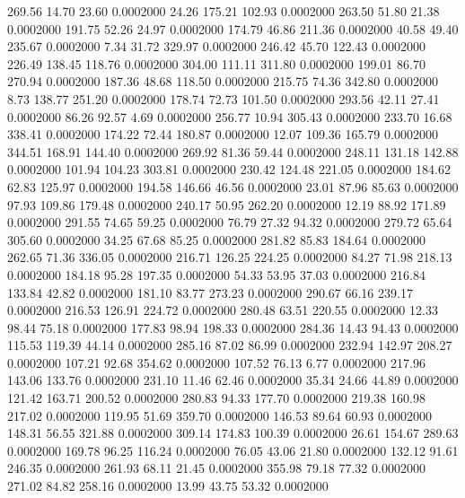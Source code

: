  269.56   14.70   23.60   0.0002000
  24.26  175.21  102.93   0.0002000
 263.50   51.80   21.38   0.0002000
 191.75   52.26   24.97   0.0002000
 174.79   46.86  211.36   0.0002000
  40.58   49.40  235.67   0.0002000
   7.34   31.72  329.97   0.0002000
 246.42   45.70  122.43   0.0002000
 226.49  138.45  118.76   0.0002000
 304.00  111.11  311.80   0.0002000
 199.01   86.70  270.94   0.0002000
 187.36   48.68  118.50   0.0002000
 215.75   74.36  342.80   0.0002000
   8.73  138.77  251.20   0.0002000
 178.74   72.73  101.50   0.0002000
 293.56   42.11   27.41   0.0002000
  86.26   92.57    4.69   0.0002000
 256.77   10.94  305.43   0.0002000
 233.70   16.68  338.41   0.0002000
 174.22   72.44  180.87   0.0002000
  12.07  109.36  165.79   0.0002000
 344.51  168.91  144.40   0.0002000
 269.92   81.36   59.44   0.0002000
 248.11  131.18  142.88   0.0002000
 101.94  104.23  303.81   0.0002000
 230.42  124.48  221.05   0.0002000
 184.62   62.83  125.97   0.0002000
 194.58  146.66   46.56   0.0002000
  23.01   87.96   85.63   0.0002000
  97.93  109.86  179.48   0.0002000
 240.17   50.95  262.20   0.0002000
  12.19   88.92  171.89   0.0002000
 291.55   74.65   59.25   0.0002000
  76.79   27.32   94.32   0.0002000
 279.72   65.64  305.60   0.0002000
  34.25   67.68   85.25   0.0002000
 281.82   85.83  184.64   0.0002000
 262.65   71.36  336.05   0.0002000
 216.71  126.25  224.25   0.0002000
  84.27   71.98  218.13   0.0002000
 184.18   95.28  197.35   0.0002000
  54.33   53.95   37.03   0.0002000
 216.84  133.84   42.82   0.0002000
 181.10   83.77  273.23   0.0002000
 290.67   66.16  239.17   0.0002000
 216.53  126.91  224.72   0.0002000
 280.48   63.51  220.55   0.0002000
  12.33   98.44   75.18   0.0002000
 177.83   98.94  198.33   0.0002000
 284.36   14.43   94.43   0.0002000
 115.53  119.39   44.14   0.0002000
 285.16   87.02   86.99   0.0002000
 232.94  142.97  208.27   0.0002000
 107.21   92.68  354.62   0.0002000
 107.52   76.13    6.77   0.0002000
 217.96  143.06  133.76   0.0002000
 231.10   11.46   62.46   0.0002000
  35.34   24.66   44.89   0.0002000
 121.42  163.71  200.52   0.0002000
 280.83   94.33  177.70   0.0002000
 219.38  160.98  217.02   0.0002000
 119.95   51.69  359.70   0.0002000
 146.53   89.64   60.93   0.0002000
 148.31   56.55  321.88   0.0002000
 309.14  174.83  100.39   0.0002000
  26.61  154.67  289.63   0.0002000
 169.78   96.25  116.24   0.0002000
  76.05   43.06   21.80   0.0002000
 132.12   91.61  246.35   0.0002000
 261.93   68.11   21.45   0.0002000
 355.98   79.18   77.32   0.0002000
 271.02   84.82  258.16   0.0002000
  13.99   43.75   53.32   0.0002000
